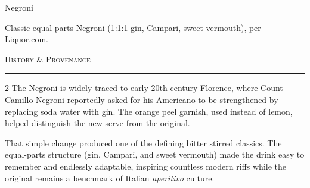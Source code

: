 \documentclass[4x6]{recipe-card}
\begin{document}
\begin{recipe}{Negroni}
\noindent\begin{minipage}{\textwidth}
\small\raggedright
{}\quad
{}\quad
\end{minipage}\par\vspace{6pt}
\begin{ingredients}
\end{ingredients}
\begin{process}
\end{process}

\vfill
\begin{recipeinfo}
    Classic equal-parts Negroni (1:1:1 gin, Campari, sweet vermouth), per Liquor.com.
\end{recipeinfo}

\back
\begin{center}
    \small\textsc{\color{recipeRed} History \& Provenance}
    \rule{\textwidth}{0.4pt}
\end{center}
\begin{multicols}{2}
  \footnotesize The Negroni is widely traced to early 20th-century
  Florence, where Count Camillo Negroni reportedly asked for his
  Americano to be strengthened by replacing soda water with gin. The
  orange peel garnish, used instead of lemon, helped distinguish the
  new serve from the original.

  That simple change produced one of the defining bitter stirred
  classics. The equal-parts structure (gin, Campari, and sweet
  vermouth) made the drink easy to remember and endlessly adaptable,
  inspiring countless modern riffs while the original remains a
  benchmark of Italian \textit{aperitivo} culture.
\end{multicols}

\vfill
\drawBackMirrorSpiritBar
\noindent\hfill{}


\end{recipe}
\end{document}
